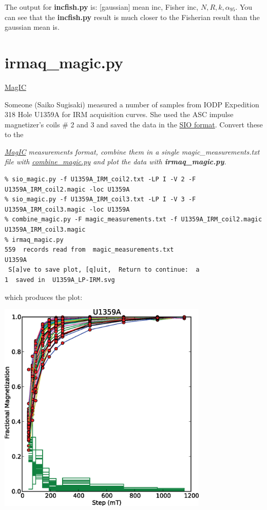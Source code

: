 \documentclass[11pt]{book}
\begin{document}
{{{The output for {\bf incfish.py} is:  [gaussian] mean inc, Fisher inc, $N, R, k, \alpha_{95}$.  You can see that the {\bf incfish.py} result is much closer to the Fisherian result than the gaussian mean is. 

\section{irmaq\_magic.py}
\href{#MagIC}{MagIC}

Someone (Saiko Sugisaki) measured a number of samples from IODP Expedition 318 Hole U1359A for IRM acquisition curves.  She used the ASC impulse magnetizer's coils \# 2 and 3 and saved the data in the \href{#sio_magic.py}{SIO format}.   Convert these to the {\it \href{#MagIC}{MagIC} measurements  format, combine them in a  single {\it magic\_measurements.txt} file with \href{#combine_magic.py}{combine\_magic.py} and plot the data with {\bf irmaq\_magic.py}. 

\begin{verbatim}
% sio_magic.py -f U1359A_IRM_coil2.txt -LP I -V 2 -F U1359A_IRM_coil2.magic -loc U1359A
% sio_magic.py -f U1359A_IRM_coil3.txt -LP I -V 3 -F U1359A_IRM_coil3.magic -loc U1359A
% combine_magic.py -F magic_measurements.txt -f U1359A_IRM_coil2.magic U1359A_IRM_coil3.magic
% irmaq_magic.py
559  records read from  magic_measurements.txt
U1359A
 S[a]ve to save plot, [q]uit,  Return to continue:  a
1  saved in  U1359A_LP-IRM.svg
\end{verbatim}

which produces the plot:

\includegraphics[width=10cm]{EPSfiles/irmaq_magic.eps}

}}}}
\end{document}
